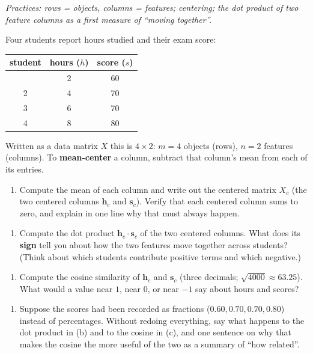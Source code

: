\documentclass[
  11pt,
]{article}
\providecommand{\tightlist}{%
  \setlength{\itemsep}{0pt}\setlength{\parskip}{0pt}}
\begin{document}
\emph{Practices: rows = objects, columns = features; centering; the dot
product of two feature columns as a first measure of ``moving
together''.}

Four students report hours studied and their exam score:

\begin{longtable}[]{@{}ccc@{}}
\toprule\noalign{}
student & hours (\(h\)) & score (\(s\)) \\
\midrule\noalign{}
\endhead
\bottomrule\noalign{}
\endlastfoot
1 & 2 & 60 \\
2 & 4 & 70 \\
3 & 6 & 70 \\
4 & 8 & 80 \\
\end{longtable}

Written as a data matrix \(X\) this is \(4\times 2\): \(m=4\) objects
(rows), \(n=2\) features (columns). To \textbf{mean-center} a column,
subtract that column's mean from each of its entries.

\begin{enumerate}
\def\labelenumi{(\alph{enumi})}
\tightlist
\item
  Compute the mean of each column and write out the centered matrix
  \(X_c\) (the two centered columns \(\mathbf{h}_c\) and
  \(\mathbf{s}_c\)). Verify that each centered column sums to zero, and
  explain in one line why that must always happen.
\end{enumerate}

\begin{enumerate}
\def\labelenumi{(\alph{enumi})}
\setcounter{enumi}{1}
\tightlist
\item
  Compute the dot product \(\mathbf{h}_c\cdot\mathbf{s}_c\) of the two
  centered columns. What does its \textbf{sign} tell you about how the
  two features move together across students? (Think about which
  students contribute positive terms and which negative.)
\end{enumerate}

\begin{enumerate}
\def\labelenumi{(\alph{enumi})}
\setcounter{enumi}{2}
\tightlist
\item
  Compute the cosine similarity of \(\mathbf{h}_c\) and \(\mathbf{s}_c\)
  (three decimals; \(\sqrt{4000} \approx 63.25\)). What would a value
  near \(1\), near \(0\), or near \(-1\) say about hours and scores?
\end{enumerate}

\begin{enumerate}
\def\labelenumi{(\alph{enumi})}
\setcounter{enumi}{3}
\tightlist
\item
  Suppose the scores had been recorded as fractions
  (\(0.60, 0.70, 0.70, 0.80\)) instead of percentages. Without redoing
  everything, say what happens to the dot product in (b) and to the
  cosine in (c), and one sentence on why that makes the cosine the more
  useful of the two as a summary of ``how related''.
\end{enumerate}
\end{document}
